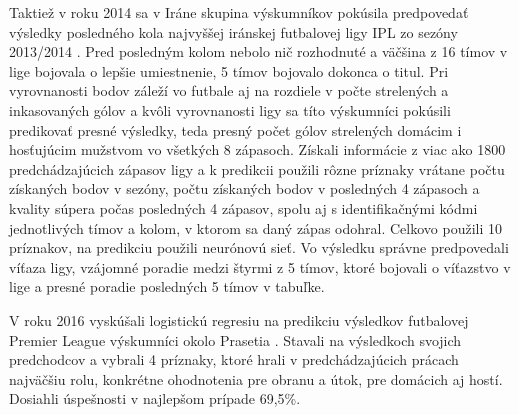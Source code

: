 Taktiež v roku 2014 sa v Iráne skupina výskumníkov pokúsila predpovedať výsledky posledného kola najvyššej iránskej futbalovej ligy IPL zo sezóny 2013/2014 \citep{related:iran}.
Pred posledným kolom nebolo nič rozhodnuté a väčšina z 16 tímov v lige bojovala o lepšie umiestnenie, 5 tímov bojovalo dokonca o titul.
Pri vyrovnanosti bodov záleží vo futbale aj na rozdiele v počte strelených a inkasovaných gólov a kvôli vyrovnanosti ligy sa títo výskumníci pokúsili predikovať presné výsledky, teda presný počet gólov strelených domácim i hosťujúcim mužstvom vo všetkých 8 zápasoch.
Získali informácie z viac ako 1800 predchádzajúcich zápasov ligy a k predikcii použili rôzne príznaky vrátane počtu získaných bodov v sezóny, počtu získaných bodov v posledných 4 zápasoch a kvality súpera počas posledných 4 zápasov, spolu aj s identifikačnými kódmi jednotlivých tímov a kolom, v ktorom sa daný zápas odohral.
Celkovo použili 10 príznakov, na predikciu použili neurónovú sieť.
Vo výsledku správne predpovedali víťaza ligy, vzájomné poradie medzi štyrmi z 5 tímov, ktoré bojovali o víťazstvo v lige a presné poradie posledných 5 tímov v tabuľke.

V roku 2016 vyskúšali logistickú regresiu na predikciu výsledkov futbalovej Premier League výskumníci okolo Prasetia \citep{related:prasetio}. 
Stavali na výsledkoch svojich predchodcov a vybrali 4 príznaky, ktoré hrali v predchádzajúcich prácach najväčšiu rolu, konkrétne ohodnotenia pre obranu a útok, pre domácich aj hostí.
Dosiahli úspešnosti v najlepšom prípade 69,5\%.